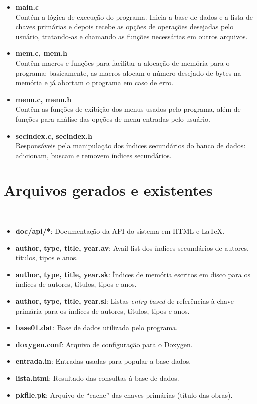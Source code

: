 \documentclass{article}
\begin{document}
\begin{itemize}
 \item \textbf{main.c}\\
	Contém a lógica de execução do programa. Inicia a base de dados e a lista de chaves primárias e depois recebe as opções de operações desejadas pelo usuário, tratando-as e chamando as funções necessárias em outros arquivos.

 \item \textbf{mem.c, mem.h}\\
	Contêm macros e funções para facilitar a alocação de memória para o programa: basicamente, as macros alocam o número desejado de bytes na memória e já abortam o programa em caso de erro.
	
 \item \textbf{menu.c, menu.h}\\
	Contêm as funções de exibição dos menus usados pelo programa, além de funções para análise das opções de menu entradas pelo usuário.

 \item \textbf{secindex.c, secindex.h}\\
	Responsáveis pela manipulação dos índices secundários do banco de dados: adicionam, buscam e removem índices secundários.
\end{itemize}

\section{Arquivos gerados e existentes}\

\begin{itemize}
 \item \textbf{doc/api/*}: Documentação da API do sistema em HTML e LaTeX.
 \item \textbf{author, type, title, year.av}: Avail list dos índices secundários de autores, títulos, tipos e anos.
 \item \textbf{author, type, title, year.sk}: Índices de memória escritos em disco para os índices de autores, títulos, tipos e anos.
 \item \textbf{author, type, title, year.sl}: Listas \textit{entry-based} de referências à chave primária para os índices de autores, títulos, tipos e anos.
 \item \textbf{base01.dat}: Base de dados utilizada pelo programa.
 \item \textbf{doxygen.conf}: Arquivo de configuração para o Doxygen.
 \item \textbf{entrada.in}: Entradas usadas para popular a base dados.
 \item \textbf{lista.html}: Resultado das consultas à base de dados.
 \item \textbf{pkfile.pk}: Arquivo de ``cache'' das chaves primárias (título das obras).
\end{itemize}
\end{document}
